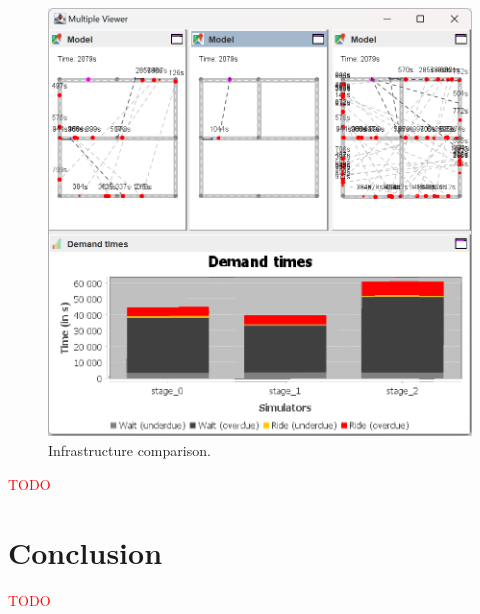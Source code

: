 \documentclass[10pt,twocolumn]{article}
\begin{document}
\begin{figure}[!ht]
    \includegraphics[width=\columnwidth]{infrastructure_comparison.png}
    \caption{Infrastructure comparison.}
    \label{fig:infratructure-comparison}
\end{figure}

\textcolor{red}{TODO}

\section{Conclusion}
\label{sec:conclusion}

\textcolor{red}{TODO}



\end{document}
